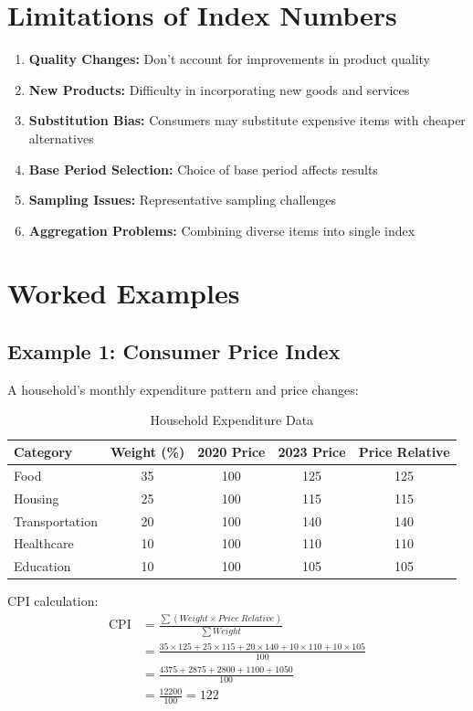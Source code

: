 \documentclass[twoside]{book}
\begin{document}
\section{Limitations of Index Numbers}

\begin{enumerate}
    \item \textbf{Quality Changes:} Don't account for improvements in product quality
    \item \textbf{New Products:} Difficulty in incorporating new goods and services
    \item \textbf{Substitution Bias:} Consumers may substitute expensive items with cheaper alternatives
    \item \textbf{Base Period Selection:} Choice of base period affects results
    \item \textbf{Sampling Issues:} Representative sampling challenges
    \item \textbf{Aggregation Problems:} Combining diverse items into single index
\end{enumerate}

\section{Worked Examples}

\subsection{Example 1: Consumer Price Index}

A household's monthly expenditure pattern and price changes:

\begin{table}[h]
\centering
\caption{Household Expenditure Data}
\begin{tabular}{lcccc}
\toprule
\textbf{Category} & \textbf{Weight (\%)} & \textbf{2020 Price} & \textbf{2023 Price} & \textbf{Price Relative} \\
\midrule
Food & 35 & 100 & 125 & 125 \\
Housing & 25 & 100 & 115 & 115 \\
Transportation & 20 & 100 & 140 & 140 \\
Healthcare & 10 & 100 & 110 & 110 \\
Education & 10 & 100 & 105 & 105 \\
\bottomrule
\end{tabular}
\end{table}

CPI calculation:
\begin{align}
\text{CPI} &= \frac{\sum (Weight \times Price\ Relative)}{\sum Weight} \\
&= \frac{35 \times 125 + 25 \times 115 + 20 \times 140 + 10 \times 110 + 10 \times 105}{100} \\
&= \frac{4375 + 2875 + 2800 + 1100 + 1050}{100} \\
&= \frac{12200}{100} = 122
\end{align}
\end{document}
